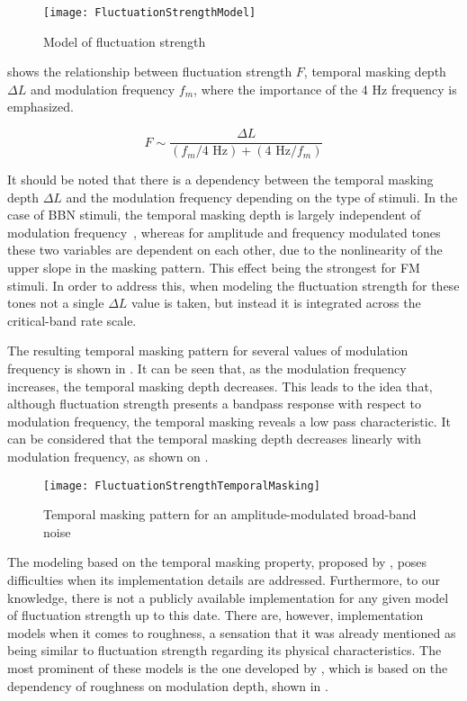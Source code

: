 \documentclass[../main.tex]{subfiles}
\begin{document}
\begin{theoreticalbackground}
\begin{figure}[!ht]
  \centering
  \texttt{[image: FluctuationStrengthModel]}
  \caption{Model of fluctuation
    strength~\cite[pp. 254]{Fastl2007Psychoacoustics}}
\label{fig:flucstrenmodel}
\end{figure}

 shows the relationship between fluctuation
strength $F$, temporal masking depth $\Delta L$ and modulation frequency
$f_{m}$, where the importance of the 4 Hz frequency is emphasized.

\begin{equation}
  F \sim \frac{\Delta L}{(f_{m}/4\text{ Hz}) + (4\text{ Hz}/f_{m})}
  \label{eq:flucstrentempmaskmodfreq}
\end{equation}

It should be noted that there is a dependency between the temporal masking depth
$\Delta L$ and the modulation frequency depending on the type of stimuli. In the
case of \gls{BBN} stimuli, the temporal masking depth is largely independent of
modulation frequency~\cite[pp.~254]{Fastl2007Psychoacoustics}, whereas for
amplitude and frequency modulated tones these two variables are dependent on
each other, due to the nonlinearity of the upper slope in the masking pattern.
This effect being the strongest for \gls{FM} stimuli. In order to address this,
when modeling the fluctuation strength for these tones not a single
$\Delta L$ value is taken, but instead it is integrated across the critical-band
rate scale.

The resulting temporal masking pattern for several values of modulation
frequency is shown in . It can be seen that, as the
modulation frequency increases, the temporal masking depth decreases. This leads
to the idea that, although fluctuation strength presents a bandpass response
with respect to modulation frequency, the temporal masking reveals a low pass
characteristic. It can be considered that the temporal masking depth decreases
linearly with modulation frequency, as shown on .

\begin{figure}[!ht]
  \centering
  \texttt{[image: FluctuationStrengthTemporalMasking]}
  \caption{Temporal masking pattern for an amplitude-modulated broad-band
    noise~\cite[pp. 255]{Fastl2007Psychoacoustics}}
\label{fig:flucstrenmasking}
\end{figure}

The modeling based on the temporal masking property, proposed by
\citeauthor{Fastl2007Psychoacoustics}, poses difficulties when its
implementation details are addressed. Furthermore, to our knowledge, there is
not a publicly available implementation for any given model of fluctuation
strength up to this date. There are, however, implementation models when it
comes to roughness, a sensation that it was already mentioned as being similar
to fluctuation strength regarding its physical characteristics. The most
prominent of these models is the one developed by
\textcite{daniel1997psychoacoustical}, which is based on the dependency of
roughness on modulation depth, shown in .


\end{theoreticalbackground}
\end{document}
